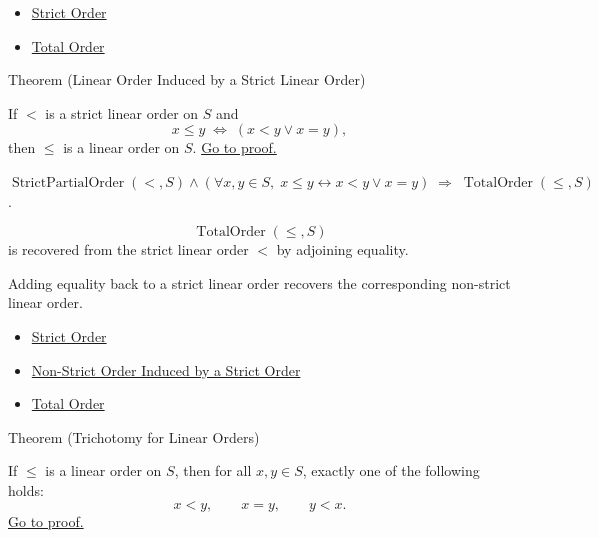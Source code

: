 \begin{dependencies}
\begin{itemize}
  \item \hyperref[def:strict-order]{Strict Order}
  \item \hyperref[def:total-order]{Total Order}
\end{itemize}
\end{dependencies}

\begin{theorembox}{Theorem (Linear Order Induced by a Strict Linear Order)}
\begin{theorem}\label{thm:linear-order-induced-by-strict-linear-order}
If $<$ is a strict linear order on $S$ and
\[
x\leq y \;\Longleftrightarrow\; (x<y\lor x=y),
\]
then $\leq$ is a linear order on $S$.
\hyperref[prf:linear-order-induced-by-strict-linear-order]{Go to proof.}
\end{theorem}
\end{theorembox}

\begin{remark*}
$\operatorname{StrictPartialOrder}(<,S)\wedge
(\forall x,y\in S,\; x\leq y\leftrightarrow x<y\vee x=y)
\;\Rightarrow\;\operatorname{TotalOrder}(\leq,S)$.
\end{remark*}

\begin{remark*}
\[
  \operatorname{TotalOrder}(\leq,S)
\] is recovered from the strict linear order
$<$ by adjoining equality.
\end{remark*}

\begin{remark*}[Interpretation]
Adding equality back to a strict linear order recovers the corresponding
non-strict linear order.
\end{remark*}

\begin{dependencies}
\begin{itemize}
  \item \hyperref[def:strict-order]{Strict Order}
  \item \hyperref[def:non-strict-order-induced-by-strict-order]{Non-Strict Order Induced by a Strict Order}
  \item \hyperref[def:total-order]{Total Order}
\end{itemize}
\end{dependencies}

\begin{theorembox}{Theorem (Trichotomy for Linear Orders)}
\begin{theorem}\label{thm:trichotomy-for-linear-orders}
If $\leq$ is a linear order on $S$, then for all $x,y\in S$, exactly one of
the following holds:
\[
x<y,\qquad x=y,\qquad y<x.
\]
\hyperref[prf:trichotomy-for-linear-orders]{Go to proof.}
\end{theorem}
\end{theorembox}

